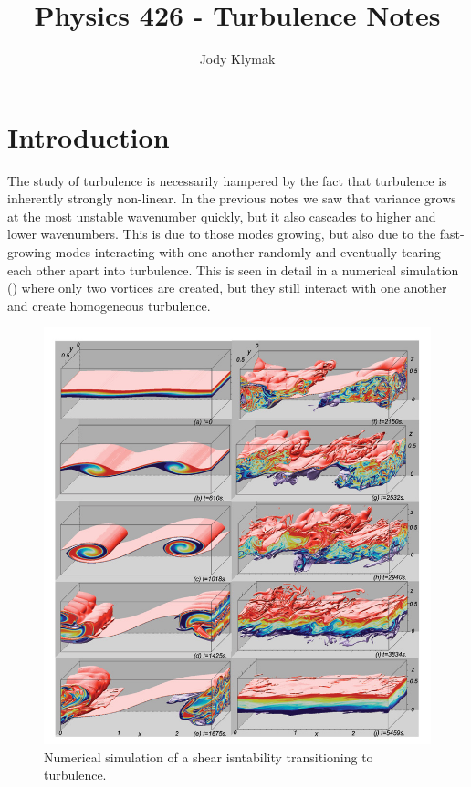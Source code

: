\documentclass[11pt]{article}
\title{Physics 426 - Turbulence Notes}
\author{Jody Klymak}
\begin{document}
\maketitle
\pagestyle{fancy}

\section{Introduction}

The study of turbulence is necessarily hampered by the fact that turbulence is
inherently strongly non-linear.  In the previous notes we saw that variance
grows at the most unstable wavenumber quickly, but it also cascades to higher
and lower wavenumbers.  This is due to those modes growing, but also due to the
fast-growing modes interacting with one another randomly and eventually tearing
each other apart into turbulence.  This is seen in detail in a numerical
simulation () where only two vortices are created, but
they still interact with one another and create  homogeneous turbulence. 


\begin{figure}[hbtp]
  \begin{center}\includegraphics[width=5in]{images/SmythEtAl05}
    \caption{Numerical simulation \citep{smythetal05} of a shear isntability
transitioning to turbulence.}
    \label{fig:SmythEtAl05}
  \end{center}
\end{figure}
\end{document}
